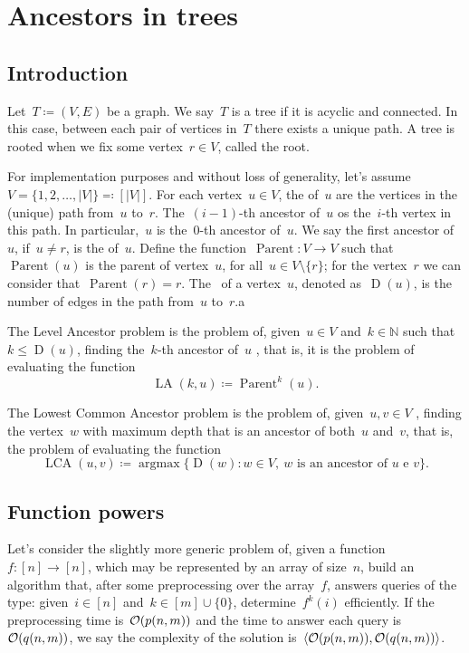 \documentclass[main.tex]{subfiles}
\providecommand{\Par}{\operatorname{Parent}}
\newcommand{\LA}{\operatorname{LA}}
\newcommand{\Dep}{\operatorname{D}}
\newcommand{\LCA}{\operatorname{LCA}}
\newcommand{\argmax}{\operatorname{argmax}}
\begin{document}
\chapter{Ancestors in trees} \label{cap:ancestrais}

\section{Introduction}


Let~$T \coloneqq (V, E)$ be a graph. We say~$T$ is a tree if it is acyclic and connected. In this case, between each pair of vertices in~$T$ there exists a unique path. A tree is rooted when we fix some vertex~${r \in V}$, called the root.

For implementation purposes and without loss of generality, let's assume~$V = \{1, 2, \ldots, |V|\} \eqqcolon [|V|]$.
For each vertex~${u \in V}$, the  of~$u$ are the vertices in the (unique) path from~$u$ to~$r$. The~\mbox{$(i-1)$-th} ancestor of~$u$ os the~$i$-th vertex in this path. In particular,~$u$ is the~$0$-th ancestor of~$u$. We say the first ancestor of~$u$, if~$u \neq r$, is the  of~$u$. Define the function~${\Par: V \rightarrow V}$ such that~$\Par(u)$ is the parent of vertex~$u$, for all~$u \in V \setminus \{r\}$; for the vertex~$r$ we can consider that~$\Par(r) = r$. The~ of a vertex~$u$, denoted as~$\Dep(u)$, is the number of edges in the path from~$u$ to~$r$.a

The Level Ancestor problem is the problem of, given~$u \in V$ and~$k \in \mathbb{N}$ such that~$k \leq \Dep(u)$, finding the~$k$-th ancestor of~$u$ , that is, it is the problem of evaluating the function
$$\LA(k, u) \coloneqq \Par^k(u). $$

The Lowest Common Ancestor problem is the problem of, given~$u, v \in V$ , finding the vertex~$w$ with maximum depth that is an ancestor of both~$u$ and~$v$, that is, the problem of evaluating the function
$$\LCA(u, v) \coloneqq \argmax\{\Dep(w) : w \in V,\ w \text{ is an ancestor of $u$ e $v$}\}. $$

\section{Function powers} \label{sec:potfunc}

Let's consider the slightly more generic problem of, given a function~$f: [n] \rightarrow [n]$, which may be represented by an array of size~$n$, build an algorithm that, after some preprocessing over the array~$f$, answers queries of the type: given~$i \in [n]$ and~$k \in [m] \cup \{0\}$, determine~$f^k(i)$ efficiently. If the preprocessing time is~$\mathcal{O}(p(n, m))$ and the time to answer each query is~$\mathcal{O}(q(n, m))$, we say the complexity of the solution is~$\langle\mathcal{O}(p(n, m)), \mathcal{O}(q(n, m))\rangle$.
\end{document}
